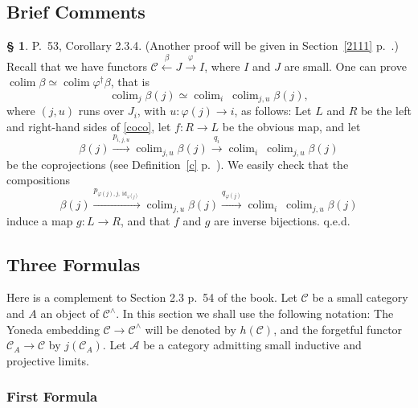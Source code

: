 \documentclass[12pt]{article}%
\theoremstyle{remark}
\theoremstyle{definition}
\newtheorem{s}[thm]{\S}%
\newcommand{\A}{\mathcal A}
\newcommand{\C}{\mathcal C}
\DeclareMathOperator*{\colim}{colim}
\DeclareMathOperator{\id}{id}
\begin{document}

\subsection{Brief Comments}

\begin{s} P.~53, Corollary 2.3.4. (Another proof will be given in Section~\ref{2111} p.~\pageref{2111}.) Recall that we have functors $\C\xleftarrow\beta J\xrightarrow\varphi I$, where $I$ and $J$ are small. One can prove $\colim\beta\simeq\colim\varphi^\dagger\beta$, that is 
%
\begin{equation}\label{coco}
\colim_j\beta(j)\simeq\colim_i\ \colim_{j,u}\beta(j),
\end{equation} 
%
where $(j,u)$ runs over $J_i$, with $u:\varphi(j)\to i$, as follows: Let $L$ and $R$ be the left and right-hand sides of \eqref{coco}, let $f:R\to L$ be the obvious map, and let
$$ 
\beta(j)\xrightarrow{p_{i,j,u}}\colim_{j,u}\beta(j)\xrightarrow{q_i}\colim_i\ \colim_{j,u}\beta(j)
$$ 
be the coprojections (see Definition~\ref{c} p.~\pageref{c}). We easily check that the compositions 
$$
\beta(j)\xrightarrow{p_{\varphi(j),j,\id_{\varphi(j)}}}\colim_{j,u}\beta(j)\xrightarrow{q_{\varphi(j)}}\colim_i\ \colim_{j,u}\beta(j)
$$ 
induce a map $g:L\to R$, and that $f$ and $g$ are inverse bijections. q.e.d.
\end{s}


\subsection{Three Formulas}

Here is a complement to Section 2.3 p.~54 of the book. Let $\C$ be a small category and $A$ an object of $\C^\wedge$. In this section we shall use the following notation: The Yoneda embedding $\C\to\C^\wedge$ will be denoted by $h(\C)$, and the forgetful functor $\C_A\to\C$ by $j(\C_A)$. Let $\A$ be a category admitting small inductive and projective limits. 

\subsubsection{First Formula}
\end{document}
